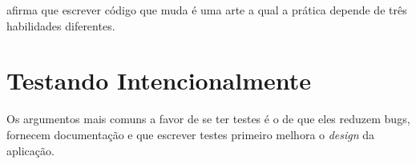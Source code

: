 
\cite{Sandi} afirma que escrever código que muda é uma arte a qual a prática depende de três habilidades diferentes. 

\section{Testando Intencionalmente}

Os argumentos mais comuns a favor de se ter testes é o de que eles reduzem bugs, fornecem documentação e que escrever testes primeiro melhora o \textit{design} da aplicação. 
